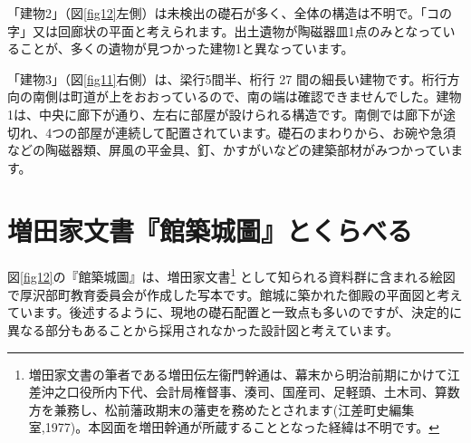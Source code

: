 \documentclass[11pt,report]{jsbook}
\begin{document}
「建物2」（図\ref{fig12}左側）は未検出の礎石が多く、全体の構造は不明で。「コの字」又は回廊状の平面と考えられます。出土遺物が陶磁器皿1点のみとなっていることが、多くの遺物が見つかった建物1と異なっています。

「建物3」（図\ref{fig11}右側）は、梁行5間半、桁行 27 間の細長い建物です。桁行方向の南側は町道が上をおおっているので、南の端は確認できませんでした。建物1は、中央に廊下が通り、左右に部屋が設けられる構造です。南側では廊下が途切れ、4つの部屋が連続して配置されています。礎石のまわりから、お碗や急須などの陶磁器類、屏風の平金具、釘、かすがいなどの建築部材がみつかっています。

\section{増田家文書『館築城圖』とくらべる}
図\ref{fig12}の『館築城圖』は、増田家文書\footnote{
増田家文書の筆者である増田伝左衞門幹通は、幕末から明治前期にかけて江差沖之口役所内下代、会計局権督事、湊司、国産司、足軽頭、土木司、算数方を兼務し、松前藩政期末の藩吏を務めたとされます(江差町史編集室,1977)。本図面を増田幹通が所蔵することとなった経緯は不明です。
}
として知られる資料群に含まれる絵図で厚沢部町教育委員会が作成した写本です。館城に築かれた御殿の平面図と考えています。後述するように、現地の礎石配置と一致点も多いのですが、決定的に異なる部分もあることから採用されなかった設計図と考えています。
\end{document}

